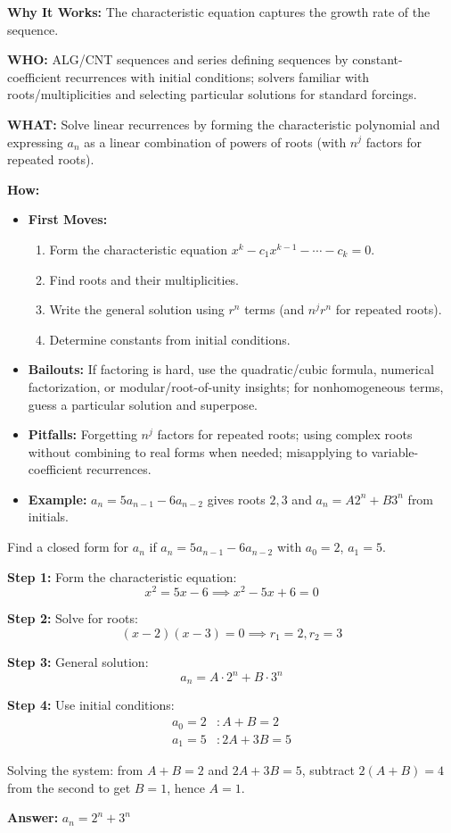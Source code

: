 \documentclass[12pt]{article}
\newenvironment{problem}[1]
{\begin{tcolorbox}[colback=blue!5!white,colframe=blue!75!black,title={#1}]}{\end{tcolorbox}}
\newenvironment{solution}
{\begin{tcolorbox}[colback=green!5!white,colframe=green!75!black,title={Solution}]}{\end{tcolorbox}}
\begin{document}
\textbf{Why It Works:} The characteristic equation captures the growth rate of the sequence.

\textbf{WHO:} ALG/CNT sequences and series defining sequences by constant-coefficient recurrences with initial conditions; solvers familiar with roots/multiplicities and selecting particular solutions for standard forcings.

\textbf{WHAT:} Solve linear recurrences by forming the characteristic polynomial and expressing $a_n$ as a linear combination of powers of roots (with $n^j$ factors for repeated roots).


\textbf{How:}
\begin{itemize}
    \item \textbf{First Moves:}
    \begin{enumerate}[nosep]
        \item Form the characteristic equation $x^k - c_1 x^{k-1} - \cdots - c_k = 0$.
        \item Find roots and their multiplicities.
        \item Write the general solution using $r^n$ terms (and $n^j r^n$ for repeated roots).
        \item Determine constants from initial conditions.
    \end{enumerate}
    \item \textbf{Bailouts:} If factoring is hard, use the quadratic/cubic formula, numerical factorization, or modular/root-of-unity insights; for nonhomogeneous terms, guess a particular solution and superpose.
    \item \textbf{Pitfalls:} Forgetting $n^j$ factors for repeated roots; using complex roots without combining to real forms when needed; misapplying to variable-coefficient recurrences.
    \item \textbf{Example:} $a_n=5a_{n-1}-6a_{n-2}$ gives roots $2,3$ and $a_n=A2^n+B3^n$ from initials.
\end{itemize}

\begin{problem}{Example: Solving a Recurrence}
Find a closed form for $a_n$ if $a_n = 5a_{n-1} - 6a_{n-2}$ with $a_0 = 2$, $a_1 = 5$.
\end{problem}

\begin{solution}
\textbf{Step 1:} Form the characteristic equation:
\[
x^2 = 5x - 6 \implies x^2 - 5x + 6 = 0
\]

\textbf{Step 2:} Solve for roots:
\[
(x - 2)(x - 3) = 0 \implies r_1 = 2, r_2 = 3
\]

\textbf{Step 3:} General solution:
\[
a_n = A \cdot 2^n + B \cdot 3^n
\]

\textbf{Step 4:} Use initial conditions:
\begin{align}
a_0 = 2 &: A + B = 2\\
a_1 = 5 &: 2A + 3B = 5
\end{align}

Solving the system: from $A + B = 2$ and $2A + 3B = 5$, subtract $2(A+B)=4$ from the second to get $B=1$, hence $A=1$.

\textbf{Answer:} $a_n = 2^n + 3^n$
\end{solution}
\end{document}
